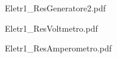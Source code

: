 \begin{figure}[0.7\textwidth]
 \centering 
  
 \caption{Eletr1_ResGeneratore2.pdf} 
 \label{gr:02_graph_4.tex}
\end{figure}

\begin{figure}[0.7\textwidth]
 \centering 
  
 \caption{Eletr1_ResVoltmetro.pdf} 
 \label{gr:02_graph_4.tex}
\end{figure}

\begin{figure}[0.7\textwidth]
 \centering 
  
 \caption{Eletr1_ResAmperometro.pdf} 
 \label{gr:02_graph_4.tex}
\end{figure}